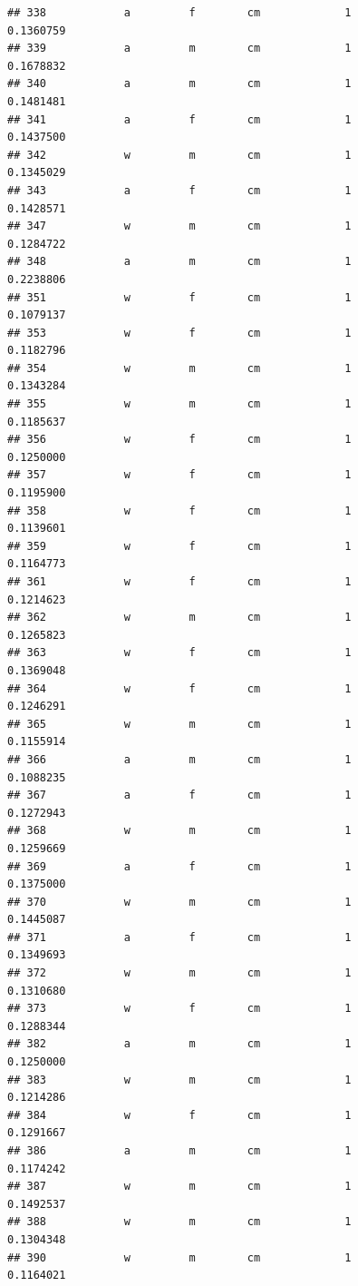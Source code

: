 \documentclass[]{article}
\begin{document}
\begin{verbatim}
## 338            a         f        cm             1          0.1360759
## 339            a         m        cm             1          0.1678832
## 340            a         m        cm             1          0.1481481
## 341            a         f        cm             1          0.1437500
## 342            w         m        cm             1          0.1345029
## 343            a         f        cm             1          0.1428571
## 347            w         m        cm             1          0.1284722
## 348            a         m        cm             1          0.2238806
## 351            w         f        cm             1          0.1079137
## 353            w         f        cm             1          0.1182796
## 354            w         m        cm             1          0.1343284
## 355            w         m        cm             1          0.1185637
## 356            w         f        cm             1          0.1250000
## 357            w         f        cm             1          0.1195900
## 358            w         f        cm             1          0.1139601
## 359            w         f        cm             1          0.1164773
## 361            w         f        cm             1          0.1214623
## 362            w         m        cm             1          0.1265823
## 363            w         f        cm             1          0.1369048
## 364            w         f        cm             1          0.1246291
## 365            w         m        cm             1          0.1155914
## 366            a         m        cm             1          0.1088235
## 367            a         f        cm             1          0.1272943
## 368            w         m        cm             1          0.1259669
## 369            a         f        cm             1          0.1375000
## 370            w         m        cm             1          0.1445087
## 371            a         f        cm             1          0.1349693
## 372            w         m        cm             1          0.1310680
## 373            w         f        cm             1          0.1288344
## 382            a         m        cm             1          0.1250000
## 383            w         m        cm             1          0.1214286
## 384            w         f        cm             1          0.1291667
## 386            a         m        cm             1          0.1174242
## 387            w         m        cm             1          0.1492537
## 388            w         m        cm             1          0.1304348
## 390            w         m        cm             1          0.1164021

\end{verbatim}
\end{document}
